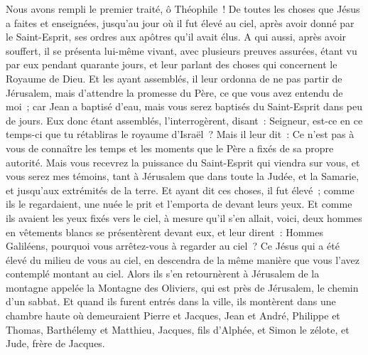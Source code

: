 \begin{multicols}{2}
\VerseOne{}Nous avons rempli le premier traité, ô Théophile~! De toutes les choses que Jésus a faites et enseignées, 
jusqu'au jour où il fut élevé au ciel, après avoir donné par le Saint-Esprit, ses ordres aux apôtres qu'il avait élus.
A qui aussi, après avoir souffert, il se présenta lui-même vivant, avec plusieurs preuves assurées, étant vu par eux pendant quarante jours, et leur parlant des choses qui concernent le Royaume de Dieu.
Et les ayant assemblés, il leur ordonna de ne pas partir de Jérusalem, mais d'attendre la promesse du Père, ce que vous avez entendu de moi~;
car Jean a baptisé d'eau, mais vous serez baptisés du Saint-Esprit dans peu de jours.
Eux donc étant assemblés, l'interrogèrent, disant~: Seigneur, est-ce en ce temps-ci que tu rétabliras le royaume d'Israël~?
Mais il leur dit~: Ce n'est pas à vous de connaître les temps et les moments que le Père a fixés de sa propre autorité.
Mais vous recevrez la puissance du Saint-Esprit qui viendra sur vous, et vous serez mes témoins, tant à Jérusalem que dans toute la Judée, et la Samarie, et jusqu'aux extrémités de la terre.
Et ayant dit ces choses, il fut élevé~; comme ils le regardaient, une nuée le prit et l'emporta de devant leurs yeux.
Et comme ils avaient les yeux fixés vers le ciel, à mesure qu'il s'en allait, voici, deux hommes en vêtements blancs se présentèrent devant eux,
et leur dirent~: Hommes Galiléens, pourquoi vous arrêtez-vous à regarder au ciel~? Ce Jésus qui a été élevé du milieu de vous au ciel, en descendra de la même manière que vous l'avez contemplé montant au ciel.
Alors ils s'en retournèrent à Jérusalem de la montagne appelée la Montagne des Oliviers, qui est près de Jérusalem, le chemin d'un sabbat.
Et quand ils furent entrés dans la ville, ils montèrent dans une chambre haute où demeuraient Pierre et Jacques, Jean et André, Philippe et Thomas, Barthélemy et Matthieu, Jacques, fils d'Alphée, et Simon le zélote, et Jude, frère de Jacques.

\end{multicols}
